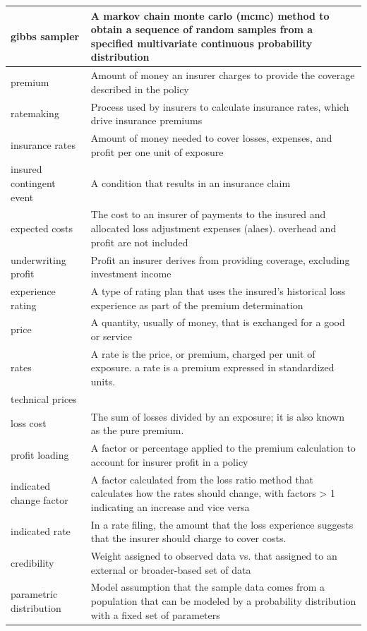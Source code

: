 \documentclass[
]{book}
\begin{document}
\begin{longtable}{>{\raggedright\arraybackslash}p{10em}|>{\raggedright\arraybackslash}p{30em}}
\hline
gibbs sampler & A markov chain monte carlo (mcmc) method to obtain a sequence of random samples from a specified multivariate continuous probability distribution\\
\hline
premium & Amount of money an insurer charges to provide the coverage described in the policy\\
\hline
ratemaking & Process used by insurers to calculate insurance rates, which drive insurance premiums\\
\hline
insurance rates & Amount of money needed to cover losses, expenses, and profit per one unit of exposure\\
\hline
insured contingent event & A condition that results in an insurance claim\\
\hline
expected costs & The cost to an insurer of payments to the insured and allocated loss adjustment expenses (alaes). overhead and profit are not included\\
\hline
underwriting profit & Profit an insurer derives from providing coverage, excluding investment income\\
\hline
experience rating & A type of rating plan that uses the insured's historical loss experience as part of the premium determination\\
\hline
price & A quantity, usually of money, that is exchanged for a good or service\\
\hline
rates & A rate is the price, or premium, charged per unit of exposure. a rate is a premium expressed in standardized units.\\
\hline
technical prices & \\
\hline
loss cost & The sum of losses divided by an exposure; it is also known as the pure premium.\\
\hline
profit loading & A factor or percentage applied to the premium calculation to account for insurer profit in a policy\\
\hline
indicated change factor & A factor calculated from the loss ratio method that calculates how the rates should change, with factors > 1 indicating an increase and vice versa\\
\hline
indicated rate & In a rate filing, the amount that the loss experience suggests that the insurer should charge to cover costs.\\
\hline
credibility & Weight assigned to observed data vs. that assigned to an external or broader-based set of data\\
\hline
parametric distribution & Model assumption that the sample data comes from a population that can be modeled by a probability distribution with a fixed set of parameters\\

\end{longtable}
\end{document}
